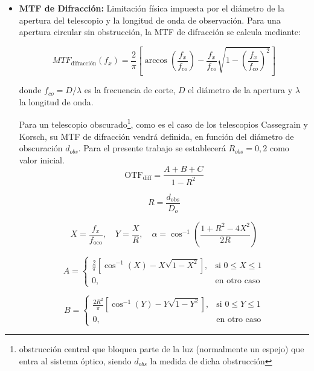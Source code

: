 \begin{itemize}
  \item \textbf{MTF de Difracción:} Limitación física impuesta por el diámetro de la apertura del telescopio y la longitud de onda de observación. Para una apertura circular sin obstrucción, la MTF de difracción se calcula mediante:

  \begin{equation}
  MTF_{\text{difracción}}(f_x) = \frac{2}{\pi} \left[ \arccos\left(\frac{f_x}{f_{co}}\right) - \frac{f_x}{f_{co}} \sqrt{1 - \left(\frac{f_x}{f_{co}}\right)^2} \right]
  \end{equation}

  donde $f_{co} = D / \lambda$ es la frecuencia de corte, $D$ el diámetro de la apertura y $\lambda$ la longitud de onda.

  Para un telescopio obscurado\footnote{obstrucción central que bloquea parte de la luz (normalmente un espejo) que entra al sistema óptico, siendo $d_{obs}$ la medida de dicha obstrucción}, como es el caso de los telescopios Cassegrain y Korsch, su MTF de difracción vendrá definida, en función del diámetro de obscuración $d_{obs}$. Para el presente trabajo se establecerá $R_{obs} = 0,2$ como valor inicial.\cite{Foadi2023DesigningCT}
\begin{equation}
\mathrm{OTF}_{\mathrm{diff}} = \frac{A + B + C}{1 - R^2}
\end{equation}

\begin{equation}\label{mtfrobs}
R = \frac{d_{\mathrm{obs}}}{D_o}
\end{equation}

\begin{equation}
X = \frac{f_x}{f_{\mathrm{oco}}}, \quad Y = \frac{X}{R}, \quad \alpha = \cos^{-1}\left(\frac{1 + R^2 - 4X^2}{2R}\right)
\end{equation}

\begin{equation}
A =
\begin{cases}
\frac{2}{\pi}\left[\cos^{-1}(X) - X\sqrt{1 - X^2}\right], & \text{si } 0 \leq X \leq 1 \\
0, & \text{en otro caso}
\end{cases}
\end{equation}

\begin{equation}
B =
\begin{cases}
\frac{2R^2}{\pi}\left[\cos^{-1}(Y) - Y\sqrt{1 - Y^2}\right], & \text{si } 0 \leq Y \leq 1 \\
0, & \text{en otro caso}
\end{cases}
\end{equation}


\end{itemize}
